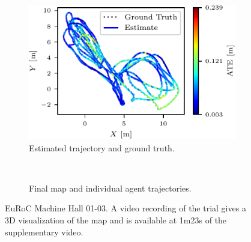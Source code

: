 \begin{figure}[h]
    \centering
    \captionsetup{format=plain}
    \begin{subfigure}[t]{0.5\linewidth}
        \centering
        \includegraphics[width=0.9\linewidth]{figures/apr11_mh_trajectory_b_trajectory.pdf}
        \caption{Estimated trajectory and ground truth.}
    \end{subfigure}\hfill%
    ~
    \begin{subfigure}[t]{0.45\linewidth}
        \centering
        \caption{Final map and individual agent trajectories.}
    \end{subfigure}

    \caption{EuRoC Machine Hall 01-03. A video recording of the trial gives a 3D visualization of the map and is available at 1m23s  of the supplementary video\protect\footnotemark[1]. }
    \label{fig:euroc-traj}

\end{figure}

